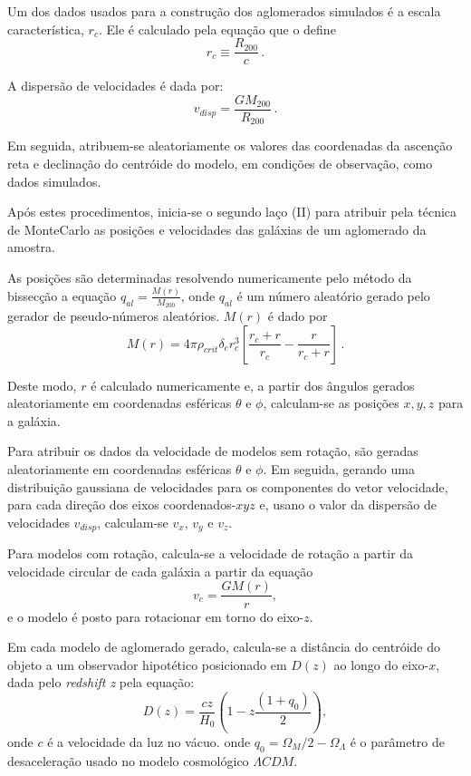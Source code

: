 Um dos dados usados para a construção dos aglomerados simulados é a escala característica, $r_c$. Ele é calculado pela equação que o define
\begin{equation}
r_c \equiv \frac{R_{200}}{c} \, .
\label{rc}
\end{equation}	

A dispersão de velocidades é dada por:
\begin{equation}
v_{disp} = \frac{GM_{200}}{R_{200}} \, .	
\label{vdisp}
\end{equation}
	
Em seguida, atribuem-se aleatoriamente os valores das coordenadas da ascenção reta e declinação do centróide do modelo, em condições de observação, como dados simulados. 


Após estes procedimentos, inicia-se o segundo laço (II) para atribuir pela técnica de MonteCarlo as posições e velocidades das galáxias de um aglomerado da amostra. 

As posições são determinadas resolvendo numericamente pelo método da bissecção a equação $q_{al} = \frac{M(r)}{M_{200}}$, onde $q_{al}$ é um número aleatório gerado pelo gerador de pseudo-números aleatórios. $M(r)$ é dado por
\begin{equation}
M(r)= 4 \pi \rho_{crit} \delta_c r_c^3 \left[ \frac{r_c + r}{r_c} - \frac{r}{r_c+r}  \right] \, .
\label{nfw2}
\end{equation}

Deste modo, $r$ é calculado  numericamente e, a partir dos ângulos gerados aleatoriamente em coordenadas esféricas $\theta$ e $\phi$, calculam-se as posições $x,y,z$ para a galáxia.

Para atribuir os dados da velocidade de modelos sem rotação, são geradas aleatoriamente em coordenadas esféricas $\theta$ e $\phi$. Em seguida, gerando uma distribuição gaussiana de velocidades para os componentes do vetor velocidade, para cada direção dos eixos coordenados-$xyz$ e, usano o valor da dispersão de velocidades $v_{disp}$, calculam-se $v_x$, $v_y$ e $v_z$. 

Para modelos com rotação, calcula-se a velocidade de rotação a partir da velocidade circular de cada galáxia a partir da equação 
\begin{equation}
v_{c} = \frac{G M(r)}{r},
\label{vcirc}
\end{equation}	
e o modelo é posto para rotacionar em torno do eixo-$z$.

Em cada modelo de aglomerado gerado, calcula-se a distância do centróide do objeto a um observador hipotético posicionado em $D(z)$ ao longo do eixo-$x$, dada pelo \textit{redshift z} pela equação: 
\begin{equation}
D(z) = \frac{c z}{H_0} \left(1-z\frac{(1+q_0)}{2}   \right), 	
\label{distanciaaglomerado}
\end{equation}
onde $c$ é a velocidade da luz no vácuo.
onde $q_0 = \Omega_{M}/2 - \Omega_{\Lambda}$ é o parâmetro de desaceleração usado no modelo cosmológico $\Lambda CDM$.

